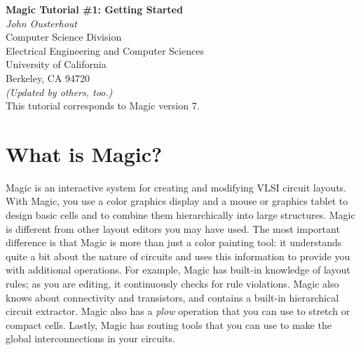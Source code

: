 \documentclass[letterpaper,twoside,12pt]{article}
\def\mytitle{Magic Tutorial \#1: Getting Started}
\begin{document}
\makeatletter
\newcommand{\ps@magic}{%
	\renewcommand{\@oddhead}{\mytitle\hfil\today}%
	\renewcommand{\@evenhead}{\today\hfil\mytitle}%
	\renewcommand{\@evenfoot}{\hfil\textrm{--{\thepage}--}\hfil}%
	\renewcommand{\@oddfoot}{\@evenfoot}}
\newcommand{\ps@mplain}{%
	\renewcommand{\@oddhead}{}%
	\renewcommand{\@evenhead}{}%
	\renewcommand{\@evenfoot}{\hfil\textrm{--{\thepage}--}\hfil}%
	\renewcommand{\@oddfoot}{\@evenfoot}}
\makeatother
\pagestyle{magic}
\thispagestyle{mplain}


\begin{center}
  {\bfseries \Large \mytitle} \\
  \vspace*{0.5in}
  {\itshape John Ousterhout} \\
  \vspace*{0.5in}
   Computer Science Division \\
   Electrical Engineering and Computer Sciences \\
   University of California \\
   Berkeley, CA  94720 \\
  \vspace*{0.25in}
  {\itshape (Updated by others, too.)} \\
  \vspace*{0.25in}
  This tutorial corresponds to Magic version 7. \\
\end{center}
\vspace*{0.5in}

\section{What is Magic?}

Magic is an interactive system for creating and modifying
VLSI circuit layouts.  With Magic, you use a color graphics
display and a mouse or graphics tablet
to design basic cells and to combine them
hierarchically into large structures.  Magic is different from
other layout editors you may have used.  The most important
difference is that Magic is more than just a color painting
tool:  it understands quite a bit about the nature of circuits
and uses this information to provide you with
additional operations.
For example, Magic has built-in knowledge of layout rules;  as
you are editing, it continuously checks for rule violations.
Magic also knows about connectivity and transistors, and
contains a built-in hierarchical
circuit extractor.  Magic also has a {\itshape plow}
operation that you can use to stretch or compact
cells.  Lastly, Magic has routing tools that you can
use to make the global interconnections in your circuits.
\end{document}
